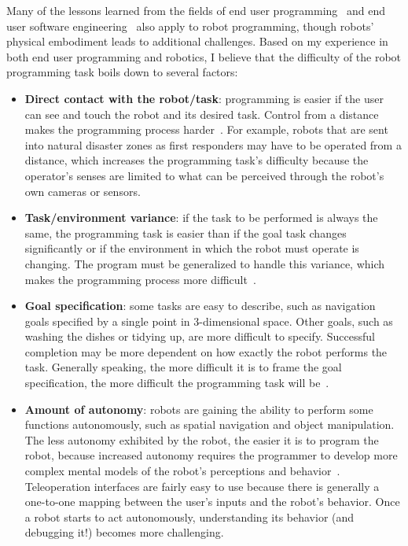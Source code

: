 \documentclass[10pt,twocolumn]{article}
\begin{document}
Many of the lessons learned from the fields of end user programming~\cite{dontcheva-nocode} and end user software engineering~\cite{ko-acm11} also apply to robot programming, though robots' physical embodiment leads to additional challenges. Based on my experience in both end user programming and robotics, I believe that the difficulty of the robot programming task boils down to several factors:

\begin{itemize}
\item {\bf Direct contact with the robot/task}: programming is easier if the user can see and touch the robot and its desired task. Control from a distance makes the programming process harder~\cite{chen-ieeetos07}. For example, robots that are sent into natural disaster zones as first responders may have to be operated from a distance, which increases the programming task's difficulty because the operator's senses are limited to what can be perceived through the robot's own cameras or sensors.

\item {\bf Task/environment variance}: if the task to be performed is always the same, the programming task is easier than if the goal task changes significantly or if the environment in which the robot must operate is changing. The program must be generalized to handle this variance, which makes the programming process more difficult~\cite{cypher-chi91,bogart-vlhcc08}.

\item {\bf Goal specification}: some tasks are easy to describe, such as navigation goals specified by a single point in 3-dimensional space. Other goals, such as washing the dishes or tidying up, are more difficult to specify. Successful completion may be more dependent on how exactly the robot performs the task. Generally speaking, the more difficult it is to frame the goal specification, the more difficult the programming task will be~\cite{ko-vlhcc04}.

\item {\bf Amount of autonomy}: robots are gaining the ability to perform some functions autonomously, such as spatial navigation and object manipulation.  The less autonomy exhibited by the robot, the easier it is to program the robot, because increased autonomy requires the programmer to develop more complex mental models of the robot's perceptions and behavior~\cite{kulesza-chi12}. Teleoperation interfaces are fairly easy to use because there is generally a one-to-one mapping between the user's inputs and the robot's behavior. Once a robot starts to act autonomously, understanding its behavior (and debugging it!) becomes more challenging.
\end{itemize}
\end{document}
